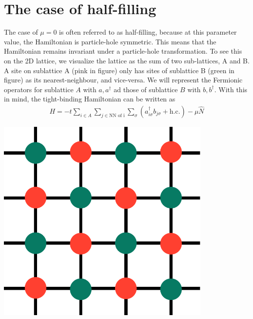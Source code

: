 \documentclass[12pt,onecolumn]{revtex4-2}
\begin{document}
\section{The case of half-filling}
\begin{minipage}{0.6\textwidth}
	The case of \(\mu=0\) is often referred to as half-filling, because at this parameter value, the Hamiltonian is particle-hole symmetric. This means that the Hamiltonian remains invariant under a particle-hole transformation. To see this on the 2D lattice, we visualize the lattice as the sum of two sub-lattices, A and B. A site on sublattice A (pink in figure) only has sites of sublattice B (green in figure) as its nearest-neighbour, and vice-versa. We will represent the Fermionic operators for sublattice \(A\) with \(a,a^\dagger\) ad those of sublattice \(B\) with \(b, b^\dagger\). With this in mind, the tight-binding Hamiltonian can be written as
\begin{equation}\begin{aligned}
	H = -t\sum_{i \in A}\sum_{j \in \text{NN of i}} \sum_\sigma\left(a^\dagger_{i \sigma}b_{j\sigma} + \text{h.c.}\right) - \mu \hat N
\end{aligned}\end{equation}
\end{minipage}
\hspace*{\fill}
\begin{minipage}{0.35\textwidth}
	\centering
	\includegraphics[width=0.8\textwidth]{./sublattice.pdf}
\end{minipage}
\end{document}
